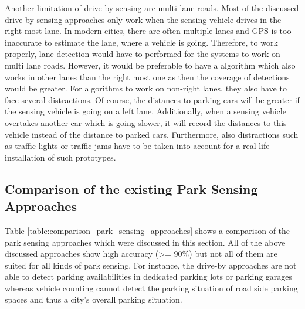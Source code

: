 Another limitation of drive-by sensing are multi-lane roads. Most of the discussed drive-by sensing approaches only work when the sensing vehicle drives in the right-most lane. In modern cities, there are often multiple lanes and GPS is too inaccurate to estimate the lane, where a vehicle is going. Therefore, to work properly, lane detection would have to performed for the systems to work on multi lane roads. However, it would be preferable to have a algorithm which also works in other lanes than the right most one as then the coverage of detections would be greater. For algorithms to work on non-right lanes, they also have to face several distractions. Of course, the distances to parking cars will be greater if the sensing vehicle is going on a left lane. Additionally, when a sensing vehicle overtakes another car which is going slower, it will record the distances to this vehicle instead of the distance to parked cars. Furthermore, also distractions such as traffic lights or traffic jams have to be taken into account for a real life installation of such prototypes.




\subsection{Comparison of the existing Park Sensing Approaches}
\label{sec:comparison_park_sensing_approaches}

Table \ref{table:comparison_park_sensing_approaches} shows a comparison of the park sensing approaches which were discussed in this section. All of the above discussed approaches show high accuracy (>= 90\%) but not all of them are suited for all kinds of park sensing. For instance, the drive-by approaches are not able to detect parking availabilities in dedicated parking lots or parking garages whereas vehicle counting cannot detect the parking situation of road side parking spaces and thus a city's overall parking situation.

